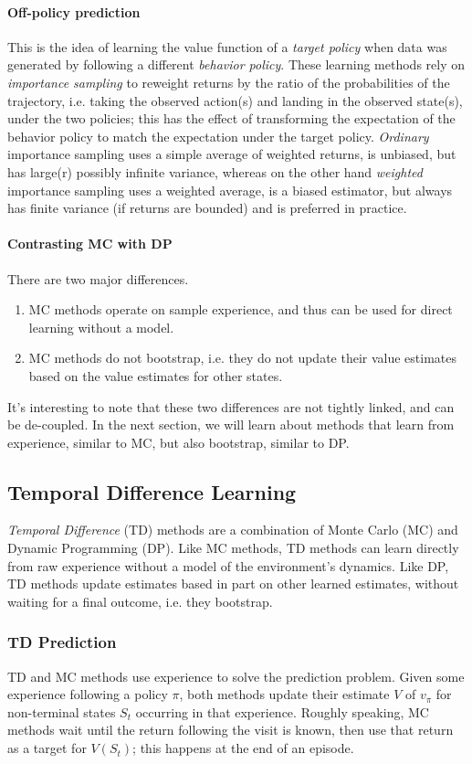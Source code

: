 \documentclass[12pt]{article}
\begin{document}
\paragraph{Off-policy prediction} This is the idea of learning the value function of a \emph{target policy} when data was generated by following a different \emph{behavior policy}. These learning methods rely on \emph{importance sampling} to reweight returns by the ratio of the probabilities of the trajectory, i.e. taking the observed action(s) and landing in the observed state(s), under the two policies; this has the effect of transforming the expectation of the behavior policy to match the expectation under the target policy. \emph{Ordinary} importance sampling uses a simple average of weighted returns, is unbiased, but has large(r) possibly infinite variance, whereas on the other hand \emph{weighted} importance sampling uses a weighted average, is a biased estimator, but always has finite variance (if returns are bounded) and is preferred in practice.

\paragraph{Contrasting MC with DP} There are two major differences.
\begin{enumerate}
  \item MC methods operate on sample experience, and thus can be used for direct     learning without a model.
\item MC methods do not bootstrap, i.e. they do not update their value estimates based on the value estimates for other states.
\end{enumerate}
It's interesting to note that these two differences are not tightly linked, and can be de-coupled. In the next section, we will learn about methods that learn from experience, similar to MC, but also bootstrap, similar to DP.

\subsection{Temporal Difference Learning}
\emph{Temporal Difference} (TD) methods are a combination of Monte Carlo (MC) and Dynamic Programming (DP). Like MC methods, TD methods can learn directly from raw experience without a model of the environment's dynamics. Like DP, TD methods update estimates based in part on other learned estimates, without waiting for a final outcome, i.e. they bootstrap.
\subsubsection{TD Prediction}
TD and MC methods use experience to solve the prediction problem. Given some experience following a policy $\pi$, both methods update their estimate $V$ of $v_\pi$ for non-terminal states $S_t$ occurring in that experience. Roughly speaking, MC methods wait until the return following the visit is known, then use that return as a target for $V(S_t)$; this happens at the end of an episode. 
\end{document}
